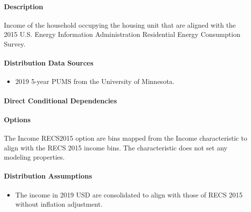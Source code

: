 \paragraph{Description}
% 
Income of the household occupying the housing unit that are aligned
with the 2015 U.S. Energy Information Administration Residential Energy
Consumption Survey.

\paragraph{Distribution Data Sources}
% 
\begin{itemize}
\item
  2019 5-year PUMS from the University of Minnesota.
\end{itemize}

\paragraph{Direct Conditional Dependencies}


\paragraph{Options}
The Income RECS2015 option are bins mapped from the Income characteristic to align with the RECS 2015 income bins. The characteristic does not set any modeling properties.

\paragraph{Distribution Assumptions}
% 
\begin{itemize}
\item
  The income in 2019 USD are consolidated to align with those of RECS 2015 without inflation adjustment.
\end{itemize}
